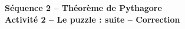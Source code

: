 \documentclass[11pt,a4paper,landscape]{article}
\begin{document}

\begin{center}
  {\sffamily\LARGE\bfseries\color{TitreC}
  Séquence 2 -- Théorème de Pythagore}\\[-0.05em]

  {\sffamily\large\bfseries\color{SavoirC}
  Activité 2 -- Le puzzle : suite -- Correction}
\end{center}

\vspace{-0.2em}


\noindent
\end{document}
